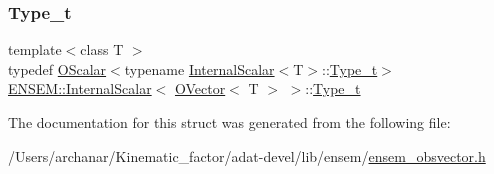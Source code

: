 \subsubsection{\texorpdfstring{Type\_t}{Type\_t}\hspace{0.1cm}{\footnotesize\ttfamily [3/3]}}
{\footnotesize\ttfamily template$<$class T $>$ \\
typedef \mbox{\hyperlink{classENSEM_1_1OScalar}{O\+Scalar}}$<$typename \mbox{\hyperlink{structENSEM_1_1InternalScalar}{Internal\+Scalar}}$<$T$>$\+::\mbox{\hyperlink{structENSEM_1_1InternalScalar_3_01OVector_3_01T_01_4_01_4_a61185c961c0397adc786d26e877adba9}{Type\+\_\+t}}$>$ \mbox{\hyperlink{structENSEM_1_1InternalScalar}{E\+N\+S\+E\+M\+::\+Internal\+Scalar}}$<$ \mbox{\hyperlink{classENSEM_1_1OVector}{O\+Vector}}$<$ T $>$ $>$\+::\mbox{\hyperlink{structENSEM_1_1InternalScalar_3_01OVector_3_01T_01_4_01_4_a61185c961c0397adc786d26e877adba9}{Type\+\_\+t}}}



The documentation for this struct was generated from the following file\+:\begin{DoxyCompactItemize}
\item 
/\+Users/archanar/\+Kinematic\+\_\+factor/adat-\/devel/lib/ensem/\mbox{\hyperlink{adat-devel_2lib_2ensem_2ensem__obsvector_8h}{ensem\+\_\+obsvector.\+h}}\end{DoxyCompactItemize}
